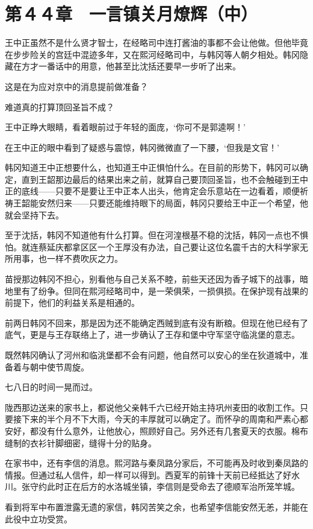 \section{第４４章　一言镇关月燎辉（中）}

王中正虽然不是什么贤才智士，在经略司中连打酱油的事都不会让他做。但他毕竟在步步险关的宫廷中混迹多年，又在熙河经略司中，与韩冈等人朝夕相处。韩冈隐藏在方才一番话中的用意，他甚至比沈括还要早一步听了出来。

这是在为应对京中的消息提前做准备？

难道真的打算顶回圣旨不成？

王中正睁大眼睛，看着眼前过于年轻的面庞，‘你可不是郭逵啊！’

在王中正的眼中看到了疑惑与震惊，韩冈微微直了一下腰，‘但我是文官！’

韩冈知道王中正想要什么，也知道王中正惧怕什么。在目前的形势下，韩冈可以确定，直到王韶那边最后的结果出来之前，就算自己要顶回圣旨，也不会触碰到王中正的底线——只要不是要让王中正本人出头，他肯定会乐意站在一边看着，顺便祈祷王韶能安然归来——只要还能维持眼下的局面，韩冈只要给王中正一个希望，他就会坚持下去。

至于沈括，韩冈不知道他有什么打算。但在河湟根基不稳的沈括，韩冈一点也不惧怕。就连蔡延庆都拿区区一个王厚没有办法，自己要让这位名震千古的大科学家无所用事，也一样不费吹灰之力。

苗授那边韩冈不担心，别看他与自己关系不睦，前些天还因为香子城下的战事，暗地里有了纷争。但同在熙河经略司中，是一荣俱荣，一损俱损。在保护现有战果的前提下，他们的利益关系是相通的。

前两日韩冈不回来，那是因为还不能确定西贼到底有没有断粮。但现在他已经有了底气，更是与王存联络上了，进一步确认了王存和堡中守军坚守临洮堡的意志。

既然韩冈确认了河州和临洮堡都不会有问题，他自然可以安心的坐在狄道城中，准备着与朝中使节周旋。

七八日的时间一晃而过。

陇西那边送来的家书上，都说他父亲韩千六已经开始主持巩州麦田的收割工作。只要接下来的半个月不下大雨，今天的丰厚就可以确定了。而怀孕的周南和严素心都安好，都没有什么意外，让他放心，照顾好自己。另外还有几套夏天的衣服。棉布缝制的衣衫针脚细密，缝得十分的贴身。

在家书中，还有李信的消息。熙河路与秦凤路分家后，不可能再及时收到秦凤路的情报。但通过私人信件，却一样可以得到。西夏军的前锋十天前已经抵达了好水川。张守约此时正在后方的水洛城坐镇，李信则是受命去了德顺军治所笼竿城。

看到将军中布置泄露无遗的家信，韩冈苦笑之余，也希望李信能安然无恙，并能在此役中立功受赏。

